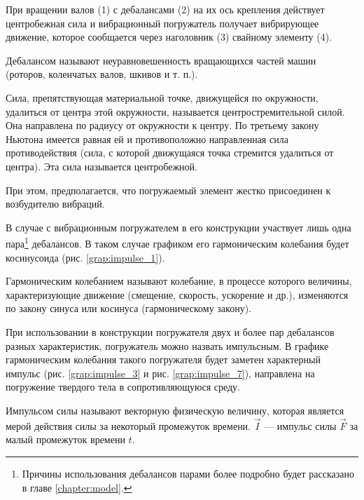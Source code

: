 При вращении валов (1) с дебалансами (2) на их ось крепления действует центробежная сила и вибрационный погружатель получает вибрирующее движение,
которое сообщается через наголовник (3) свайному элементу (4).

\begin{definition}
    Дебалансом называют неуравновешенность вращающихся частей машин (роторов, коленчатых валов, шкивов и т. п.).
\end{definition}

\begin{definition}
    Сила, препятствующая материальной точке, движущейся по окружности, удалиться от центра этой окружности,
    называется центростремительной силой. Она направлена по радиусу от окружности к центру.
    По третьему закону Ньютона имеется равная ей и противоположно направленная сила противодействия
    (сила, с которой движущаяся точка стремится удалиться от центра). Эта сила называется центробежной.
\end{definition}

При этом, предполагается, что погружаемый элемент жестко присоединен к возбудителю вибраций.

В случае с вибрационным погружателем в его конструкции участвует лишь одна
пара\footnote{Причины использования дебалансов парами более подробно будет рассказано в главе \ref{chapter:model}.} дебалансов.
В таком случае графиком его гармоническим колебания будет косинусоида (рис. \ref{grap:impulse_1}).

\begin{definition}
    Гармоническим колебанием называют колебание, в процессе которого величины, характеризующие движение (смещение, скорость, ускорение и др.),
    изменяются по закону синуса или косинуса (гармоническому закону).
\end{definition}

При использовании в конструкции погружателя двух и более пар дебалансов разных характеристик, погружатель можно назвать импульсным.
В графике гармоническим колебания такого погружателя будет заметен характерный импульс (рис. \ref{grap:impulse_3} и рис. \ref{grap:impulse_7}),
направлена на погружение твердого тела в сопротивляющуюся среду.

\begin{definition}
    Импульсом силы называют векторную физическую величину, которая является мерой действия силы за некоторый промежуток времени.
    $\vec{I}$ --- импульс силы $\vec{F}$ за малый промежуток времени $t$.
\end{definition}

